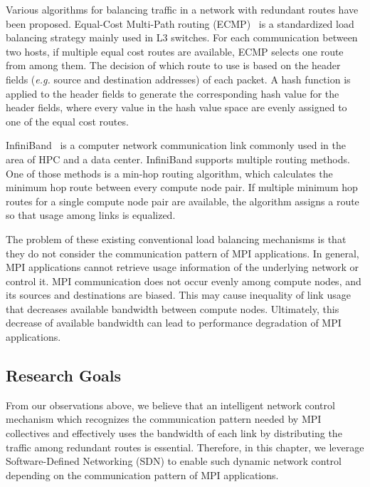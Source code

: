 Various algorithms for balancing traffic in a network with redundant
routes have been proposed. Equal-Cost Multi-Path routing (ECMP)~\autocite{ecmp} is
a standardized load balancing strategy mainly used in L3 switches. For each
communication between two hosts, if multiple equal cost routes are available,
ECMP selects one route from among them. The decision of which route to use is
based on the header fields (\emph{e.g.} source and destination addresses) of
each packet. A hash function is applied to the header fields to generate the
corresponding hash value for the header fields, where every value in the hash
value space are evenly assigned to one of the equal cost routes.

InfiniBand~\autocite{Buyya2009} is a computer network communication link
commonly used in the area of HPC and a data center. InfiniBand supports
multiple routing methods. One of those methods is a min-hop routing
algorithm, which calculates the minimum hop route between every
compute node pair. If multiple minimum hop routes for a single
compute node pair are available, the algorithm assigns a route so that
usage among links is equalized.

The problem of these existing conventional load balancing mechanisms is
that they do not consider the communication pattern of MPI
applications. In general, MPI applications cannot retrieve usage
information of the underlying network or control it. MPI communication
does not occur evenly among compute nodes, and its sources and
destinations are biased. This may cause inequality of link usage that
decreases available bandwidth between compute nodes. Ultimately, this
decrease of available bandwidth can lead to performance degradation of MPI
applications.

\subsection{Research Goals}

From our observations above, we believe that an intelligent network control
mechanism which recognizes the communication pattern needed by MPI collectives
and effectively uses the bandwidth of each link by distributing the traffic
among redundant routes is essential. Therefore, in this chapter, we leverage
Software-Defined Networking (SDN) to enable such dynamic network control
depending on the communication pattern of MPI applications.

